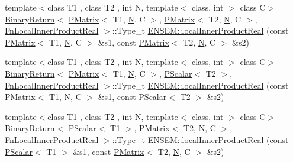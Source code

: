 \begin{DoxyCompactItemize}
\item 
{\footnotesize template$<$class T1 , class T2 , int N, template$<$ class, int $>$ class C$>$ }\\\mbox{\hyperlink{structENSEM_1_1BinaryReturn}{Binary\+Return}}$<$ \mbox{\hyperlink{classENSEM_1_1PMatrix}{P\+Matrix}}$<$ T1, \mbox{\hyperlink{adat__devel_2lib_2hadron_2operator__name__util_8cc_a7722c8ecbb62d99aee7ce68b1752f337}{N}}, C $>$, \mbox{\hyperlink{classENSEM_1_1PMatrix}{P\+Matrix}}$<$ T2, \mbox{\hyperlink{adat__devel_2lib_2hadron_2operator__name__util_8cc_a7722c8ecbb62d99aee7ce68b1752f337}{N}}, C $>$, \mbox{\hyperlink{structENSEM_1_1FnLocalInnerProductReal}{Fn\+Local\+Inner\+Product\+Real}} $>$\+::Type\+\_\+t \mbox{\hyperlink{group__primmatrix_ga512767c96aa10eafdf3b60be8dd2e9bb}{E\+N\+S\+E\+M\+::local\+Inner\+Product\+Real}} (const \mbox{\hyperlink{classENSEM_1_1PMatrix}{P\+Matrix}}$<$ T1, \mbox{\hyperlink{adat__devel_2lib_2hadron_2operator__name__util_8cc_a7722c8ecbb62d99aee7ce68b1752f337}{N}}, C $>$ \&s1, const \mbox{\hyperlink{classENSEM_1_1PMatrix}{P\+Matrix}}$<$ T2, \mbox{\hyperlink{adat__devel_2lib_2hadron_2operator__name__util_8cc_a7722c8ecbb62d99aee7ce68b1752f337}{N}}, C $>$ \&s2)
\item 
{\footnotesize template$<$class T1 , class T2 , int N, template$<$ class, int $>$ class C$>$ }\\\mbox{\hyperlink{structENSEM_1_1BinaryReturn}{Binary\+Return}}$<$ \mbox{\hyperlink{classENSEM_1_1PMatrix}{P\+Matrix}}$<$ T1, \mbox{\hyperlink{adat__devel_2lib_2hadron_2operator__name__util_8cc_a7722c8ecbb62d99aee7ce68b1752f337}{N}}, C $>$, \mbox{\hyperlink{classENSEM_1_1PScalar}{P\+Scalar}}$<$ T2 $>$, \mbox{\hyperlink{structENSEM_1_1FnLocalInnerProductReal}{Fn\+Local\+Inner\+Product\+Real}} $>$\+::Type\+\_\+t \mbox{\hyperlink{group__primmatrix_ga9db3f5557c105ded2a1e426229646f23}{E\+N\+S\+E\+M\+::local\+Inner\+Product\+Real}} (const \mbox{\hyperlink{classENSEM_1_1PMatrix}{P\+Matrix}}$<$ T1, \mbox{\hyperlink{adat__devel_2lib_2hadron_2operator__name__util_8cc_a7722c8ecbb62d99aee7ce68b1752f337}{N}}, C $>$ \&s1, const \mbox{\hyperlink{classENSEM_1_1PScalar}{P\+Scalar}}$<$ T2 $>$ \&s2)
\item 
{\footnotesize template$<$class T1 , class T2 , int N, template$<$ class, int $>$ class C$>$ }\\\mbox{\hyperlink{structENSEM_1_1BinaryReturn}{Binary\+Return}}$<$ \mbox{\hyperlink{classENSEM_1_1PScalar}{P\+Scalar}}$<$ T1 $>$, \mbox{\hyperlink{classENSEM_1_1PMatrix}{P\+Matrix}}$<$ T2, \mbox{\hyperlink{adat__devel_2lib_2hadron_2operator__name__util_8cc_a7722c8ecbb62d99aee7ce68b1752f337}{N}}, C $>$, \mbox{\hyperlink{structENSEM_1_1FnLocalInnerProductReal}{Fn\+Local\+Inner\+Product\+Real}} $>$\+::Type\+\_\+t \mbox{\hyperlink{group__primmatrix_ga8a2b85a888121b8b0ff46870c7705474}{E\+N\+S\+E\+M\+::local\+Inner\+Product\+Real}} (const \mbox{\hyperlink{classENSEM_1_1PScalar}{P\+Scalar}}$<$ T1 $>$ \&s1, const \mbox{\hyperlink{classENSEM_1_1PMatrix}{P\+Matrix}}$<$ T2, \mbox{\hyperlink{adat__devel_2lib_2hadron_2operator__name__util_8cc_a7722c8ecbb62d99aee7ce68b1752f337}{N}}, C $>$ \&s2)

\end{DoxyCompactItemize}
